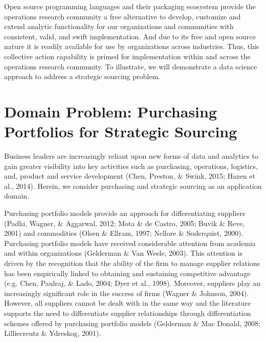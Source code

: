 \documentclass[twocolumn]{svjour3}       %
\begin{document}
Open source programming languages and their packaging ecosystem provide the operations research community a free alternative to develop, customize and extend analytic functionality for our organizations and communities with consistent, valid, and swift implementation. And due to its free and open source nature it is readily available for use by organizations across industries. Thus, this collective action capability is primed for implementation within and across the operations research community.  To illustrate, we will demonstrate a data science approach to address a strategic sourcing problem.


\section{Domain Problem: Purchasing Portfolios for Strategic Sourcing}
\label{sec:3}

Business leaders are increasingly reliant upon new forms of data and analytics to gain greater visibility into key activities such as purchasing, operations, logistics, and, product and service development (Chen, Preston, \& Swink, 2015; Hazen et al., 2014). Herein, we consider purchasing and strategic sourcing as an application domain. 

Purchasing portfolio models provide an approach for differentiating suppliers (Padhi, Wagner, \& Aggarwal, 2012; Mota \& de Castro, 2005; Buvik \& Reve, 2001) and commodities (Olsen \& Ellram, 1997; Nellore \& Soderquist, 2000).  Purchasing portfolio models have received considerable attention from academia and within organizations (Gelderman \& Van Weele, 2003).  This attention is driven by the recognition that the ability of the firm to manage supplier relations has been empirically linked to obtaining and sustaining competitive advantage (e.g. Chen, Paulraj, \& Lado, 2004; Dyer et al., 1998). Moreover, suppliers play an increasingly significant role in the success of firms (Wagner \& Johnson, 2004). However, all suppliers cannot be dealt with in the same way and the literature supports the need to differentiate supplier relationships through differentiation schemes offered by purchasing portfolio models (Gelderman \& Mac Donald, 2008; Lilliecreutz \& Ydreskog, 2001).  
\end{document}
